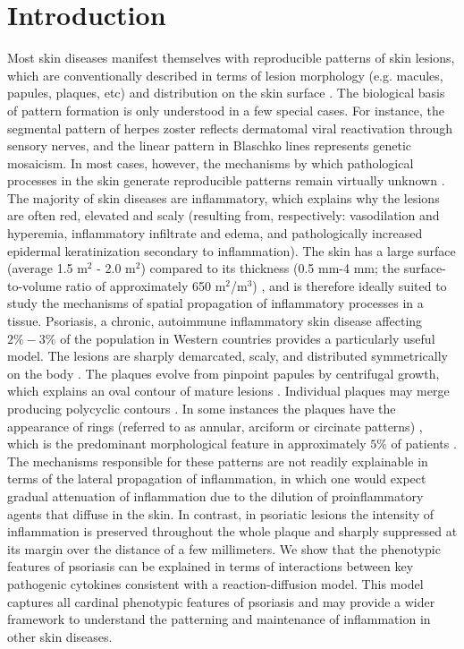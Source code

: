 \section{Introduction} 
Most skin diseases manifest themselves with reproducible patterns of skin lesions, which are conventionally described in terms of lesion morphology (e.g. macules, papules, plaques, etc) and distribution on the skin surface \citep{nast2016}. The biological basis of pattern formation is only understood in a few special cases. For instance, the segmental pattern of herpes zoster reflects dermatomal viral reactivation through sensory nerves, and the linear pattern in Blaschko lines represents genetic mosaicism. In most cases, however, the mechanisms by which pathological processes in the skin generate reproducible patterns remain virtually unknown \citep{nast2016}.
The majority of skin diseases are inflammatory, which explains why the lesions are often red, elevated and scaly (resulting from, respectively: vasodilation and hyperemia, inflammatory infiltrate and edema, and pathologically increased epidermal keratinization secondary to inflammation). The skin has a large surface (average 1.5 m$^2$ - 2.0 m$^2$) compared to its thickness (0.5 mm-4 mm; the surface-to-volume ratio of approximately 650 m$^2$/m$^3$) \citep{leider1949}, and is therefore ideally suited to study the mechanisms of spatial propagation of inflammatory processes in a tissue. Psoriasis, a chronic, autoimmune inflammatory skin disease affecting $2\%-3\%$ of the population in Western countries \citep{parisi2013} provides a particularly useful model. The lesions are sharply demarcated, scaly, and distributed symmetrically on the body \citep{christophers2001, griffiths2007, nestle2009}. The plaques evolve from pinpoint papules by centrifugal growth, which explains an oval contour of mature lesions \citep{farber1985, soltani1972}. Individual plaques may merge producing polycyclic contours \citep{christophers2001, farber1985}. In some instances the plaques have the appearance of rings (referred to as annular, arciform or circinate patterns) \citep{christophers2001, nast2016}, which is the predominant morphological feature in approximately $5\%$ of patients \citep{morris2001}. The mechanisms responsible for these patterns are not readily explainable in terms of the lateral propagation of inflammation, in which one would expect gradual attenuation of inflammation due to the dilution of proinflammatory agents that diffuse in the skin. In contrast, in psoriatic lesions the intensity of inflammation is preserved throughout the whole plaque and sharply suppressed at its margin over the distance of a few millimeters. We show that the phenotypic features of psoriasis can be explained in terms of interactions between key pathogenic cytokines consistent with a reaction-diffusion model. This model captures all cardinal phenotypic features of psoriasis and may provide a wider framework to understand the patterning and maintenance of inflammation in other skin diseases. 

